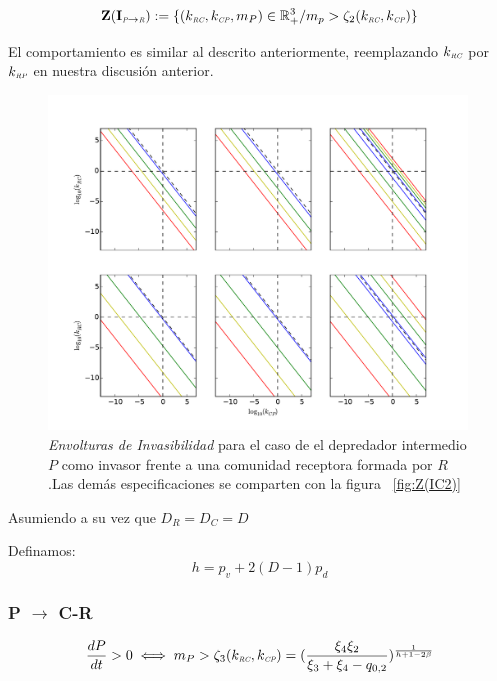 \begin{equation}
\mathbf{Z(I_{\textit{\tiny P} \to \textit{\tiny R}})} := \{ (k_{\textit{\tiny RC}},k_{\textit{\tiny CP}},m_P) \in \mathbb{R}^3_+ / m_p > \zeta_2(k_{\textit{\tiny RC}},k_{\textit{\tiny CP}}) \}
\end{equation}

El comportamiento es similar al descrito anteriormente, reemplazando $k_{\textit{\tiny RC}}$ por $k_{\textit{\tiny RP}}$ en nuestra discusi\'on anterior.


\begin{figure}
  \centering
  \includegraphics[width = 0.99\textwidth]{./Plots/Z(IC3)AcGrGr.pdf}
  \caption[Env $Z(IC2)$]{\emph{Envolturas de Invasibilidad} para el caso de el depredador intermedio $P$ como invasor frente a una comunidad receptora formada por $R$.Las dem\'as especificaciones se comparten con la figura ~\ref{fig:Z(IC2)}}
  \label{fig:Z(IC3)}
\end{figure}


Asumiendo a su vez que $D_R = D_C = D$

Definamos:
\begin{equation}
  h = p_v + 2(D-1)p_d
\end{equation}

\subsubsection{P $\to$ C-R}
\begin{equation}
  \frac{dP}{dt}  >0 \iff m_P > \zeta_3(k_{\textit{\tiny RC}},k_{\textit{\tiny CP}}) = (\frac{\xi_4\xi_2}{\xi_3 + \xi_4 - q_{0,2}})^{\frac{1}{h + 1 - 2\beta}}
\end{equation}

